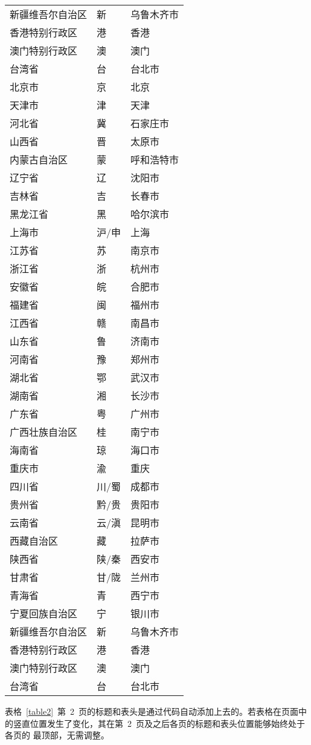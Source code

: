 \begin{longtable}{l@{\hspace{6.5mm}}l@{\hspace{5.5mm}}l}
新疆维吾尔自治区 & 新 & 乌鲁木齐市\\
香港特别行政区 & 港 & 香港\\
澳门特别行政区 & 澳 & 澳门\\
台湾省 & 台 & 台北市\\
北京市 & 京 & 北京\\
天津市 & 津 & 天津\\
河北省 & 冀 & 石家庄市\\
山西省 & 晋 & 太原市\\
内蒙古自治区 & 蒙 & 呼和浩特市\\
辽宁省 & 辽 & 沈阳市\\
吉林省 & 吉 & 长春市\\
黑龙江省 & 黑 & 哈尔滨市\\
上海市 & 沪/申 & 上海\\
江苏省 & 苏 & 南京市\\
浙江省 & 浙 & 杭州市\\
安徽省 & 皖 & 合肥市\\
福建省 & 闽 & 福州市\\
江西省 & 赣 & 南昌市\\
山东省 & 鲁 & 济南市\\
河南省 & 豫 & 郑州市\\
湖北省 & 鄂 & 武汉市\\
湖南省 & 湘 & 长沙市\\
广东省 & 粤 & 广州市\\
广西壮族自治区 & 桂 & 南宁市\\
海南省 & 琼 & 海口市\\
重庆市 & 渝 & 重庆\\
四川省 & 川/蜀 & 成都市\\
贵州省 & 黔/贵 & 贵阳市\\
云南省 & 云/滇 & 昆明市\\
西藏自治区 & 藏 & 拉萨市\\
陕西省 & 陕/秦 & 西安市\\
甘肃省 & 甘/陇 & 兰州市\\
青海省 & 青 & 西宁市\\
宁夏回族自治区 & 宁 & 银川市\\
新疆维吾尔自治区 & 新 & 乌鲁木齐市\\
香港特别行政区 & 港 & 香港\\
澳门特别行政区 & 澳 & 澳门\\
台湾省 & 台 & 台北市\\
\end{longtable}

表格~\ref{table2}~第~2~页的标题和表头是通过代码自动添加上去的。若表格在页面中
的竖直位置发生了变化，其在第~2~页及之后各页的标题和表头位置能够始终处于各页的
最顶部，无需调整。

